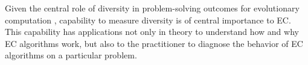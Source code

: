 %
%
Given the central role of diversity in problem-solving outcomes for evolutionary computation \citep{mcphee1999analysis,michalewicz1996genetic,gabor2021productive}, capability to measure diversity is of central importance to EC.
This capability has applications not only in theory to understand how and why EC algorithms work, but also to the practitioner to diagnose the behavior of EC algorithms on a particular problem.

